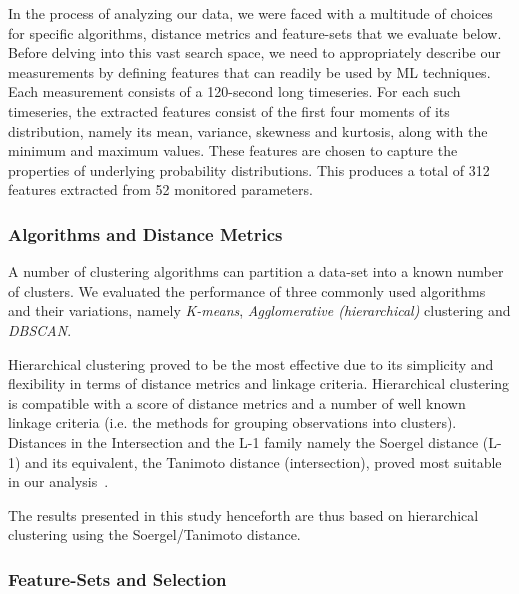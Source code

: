 \documentclass[journal,comsoc]{IEEEtran}
\begin{document}
% 
In the process of analyzing our data, we were faced with a multitude of choices for specific algorithms, distance metrics and feature-sets that we evaluate below.
Before delving into this vast search space, we need to appropriately describe our measurements by defining features that can readily be used by ML techniques.
Each measurement consists of a 120-second long timeseries.
For each such timeseries, the extracted features consist of the first four moments of its distribution, namely its mean, variance, skewness and kurtosis, along with the minimum and maximum values.
These features are chosen to capture the properties of underlying probability distributions.
This produces a total of 312 features extracted from 52 monitored parameters.

% 
\subsubsection{Algorithms and Distance Metrics}
\label{sec:analysis_algorithms}


% 
A number of clustering algorithms can partition a data-set into a known number of clusters. We evaluated the performance of three commonly used algorithms~\cite{schutze2008introduction} and their variations, namely \textit{K-means}, \textit{Agglomerative (hierarchical)} clustering and \textit{DBSCAN}.


Hierarchical clustering proved to be the most effective due to its simplicity and flexibility in terms of distance metrics and linkage criteria.
Hierarchical clustering is compatible with a score of distance metrics and a number of well known linkage criteria (i.e. the methods for grouping observations into clusters).
Distances in the Intersection and the L-1 family namely the Soergel distance (L-1) and its equivalent, the Tanimoto distance (intersection), proved most suitable in our analysis~\cite{cha2007comprehensive}.

The results presented in this study henceforth are thus based on hierarchical clustering using the Soergel/Tanimoto distance. 


% 
\subsubsection{Feature-Sets and Selection}
\label{sec:analysis_features}

% 
\end{document}
